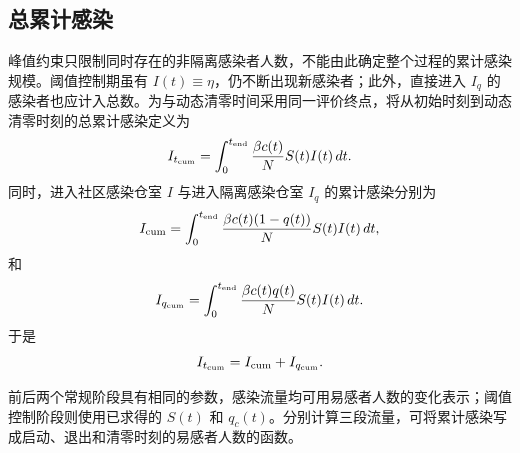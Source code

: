\documentclass[UTF8,a4paper,10pt,fontset=fandol]{ctexart}
\theoremstyle{cnplain}
\theoremstyle{remark}
\newcommand{\Itcum}{I_{t_{\mathrm{cum}}}}
\numberwithin{equation}{section}
\begin{document}
\subsection{总累计感染}
峰值约束只限制同时存在的非隔离感染者人数，不能由此确定整个过程的累计感染规模。阈值控制期虽有 $I(t)\equiv\eta$，仍不断出现新感染者；此外，直接进入 $I_q$ 的感染者也应计入总数。为与动态清零时间采用同一评价终点，将从初始时刻到动态清零时刻的总累计感染定义为
\begin{equation}
\Itcum
=
\int_0^{t_{\rm end}}\frac{\beta c(t)}{N}S(t)I(t)\,dt.
\end{equation}
同时，进入社区感染仓室 $I$ 与进入隔离感染仓室 $I_q$ 的累计感染分别为
\begin{equation}
I_{\rm cum}
=
\int_0^{t_{\rm end}}
\frac{\beta c(t)(1-q(t))}{N}S(t)I(t)\,dt,
\end{equation}
和
\begin{equation}
I_{q_{\rm cum}}
=
\int_0^{t_{\rm end}}
\frac{\beta c(t)q(t)}{N}S(t)I(t)\,dt.
\end{equation}
于是
\[
\Itcum=I_{\rm cum}+I_{q_{\rm cum}}.
\]

前后两个常规阶段具有相同的参数，感染流量均可用易感者人数的变化表示；阈值控制阶段则使用已求得的 $S(t)$ 和 $q_c(t)$。分别计算三段流量，可将累计感染写成启动、退出和清零时刻的易感者人数的函数。
\end{document}
